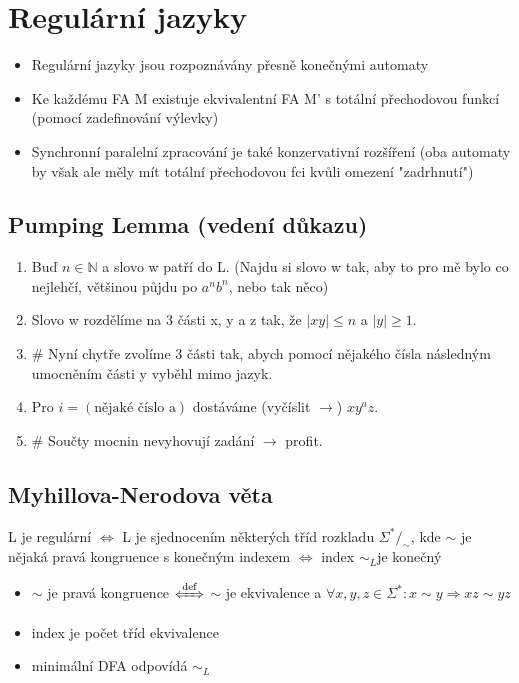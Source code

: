 \documentclass[a4paper]{article}
\begin{document}
\section{Regulární jazyky}
\begin{itemize}
    \item Regulární jazyky jsou rozpoznávány přesně konečnými automaty
    \item Ke každému FA M existuje ekvivalentní FA M' s totální přechodovou funkcí (pomocí zadefinování výlevky) 
    \item Synchronní paralelní zpracování je také konzervativní rozšíření (oba automaty by však ale měly mít totální přechodovou fci kvůli omezení "zadrhnutí")
\end{itemize}
\subsection*{Pumping Lemma (vedení důkazu)}
\begin{enumerate}
    \item Buď \(n \in \mathds{N}\) a slovo w patří do L. (Najdu si slovo w tak, aby to pro mě bylo co nejlehčí, většinou půjdu po \( a^nb^n\), nebo tak něco)
    \item Slovo w rozdělíme na 3 části x, y a z tak, že \(|xy| \leq n\) a \(|y| \geq 1\).
    \item \# Nyní chytře zvolíme 3 části tak, abych pomocí nějakého čísla následným umocněním části y vyběhl mimo jazyk.
    \item Pro \(i = (\text{nějaké číslo a})\) dostáváme (vyčíslit \(\rightarrow\)) \( xy^{a}z \).
    \item \# Součty mocnin nevyhovují zadání \(\rightarrow \) profit.
\end{enumerate}
\subsection*{Myhillova-Nerodova věta}
L je regulární \(\Leftrightarrow \) L je sjednocením některých tříd rozkladu \( \Sigma^* /_\sim \), kde \(\sim \) je nějaká pravá kongruence s konečným indexem \(\Leftrightarrow \) index \( \sim_L \)je konečný
\begin{itemize}
    \item \(\sim \) je pravá kongruence \(\xLeftrightarrow{\text{def}}\) \(\sim \) je ekvivalence a \(\forall x,y,z \in \Sigma^*: x \sim y \Rightarrow xz \sim yz \)
    \item index je počet tříd ekvivalence
    \item minimální DFA odpovídá \(\sim_L \)
\end{itemize}
\end{document}

